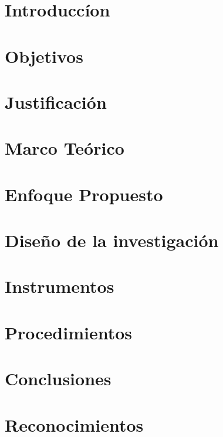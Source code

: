 \documentclass[journal]{IEEEtran}
\begin{document}


\maketitle





\section{Introduccíon}


\section{Objetivos}


\section{Justificación}


\section{Marco Teórico}


\section{Enfoque Propuesto}


\section{Diseño de la investigación}


\section{Instrumentos}


\section{Procedimientos}


\section{Conclusiones}


\appendices


\section*{Reconocimientos}





\end{document}
